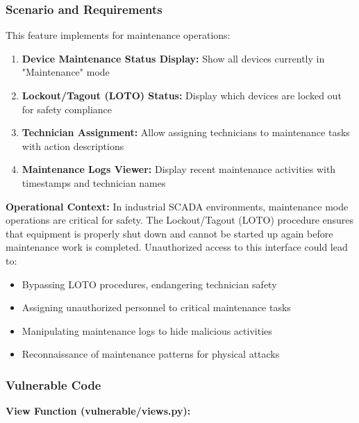 \documentclass[12pt,a4paper]{article}
\begin{document}
\subsubsection{Scenario and Requirements}

This feature implements for maintenance operations:

\begin{enumerate}[leftmargin=*]
    \item \textbf{Device Maintenance Status Display:} Show all devices currently in "Maintenance" mode
    \item \textbf{Lockout/Tagout (LOTO) Status:} Display which devices are locked out for safety compliance
    \item \textbf{Technician Assignment:} Allow assigning technicians to maintenance tasks with action descriptions
    \item \textbf{Maintenance Logs Viewer:} Display recent maintenance activities with timestamps and technician names
\end{enumerate}

\textbf{Operational Context:}
In industrial SCADA environments, maintenance mode operations are critical for safety. The Lockout/Tagout (LOTO) procedure ensures that equipment is properly shut down and cannot be started up again before maintenance work is completed. Unauthorized access to this interface could lead to:
\begin{itemize}[leftmargin=*]
    \item Bypassing LOTO procedures, endangering technician safety
    \item Assigning unauthorized personnel to critical maintenance tasks
    \item Manipulating maintenance logs to hide malicious activities
    \item Reconnaissance of maintenance patterns for physical attacks
\end{itemize}

\subsubsection{Vulnerable Code}

\textbf{View Function (vulnerable/views.py):}
\end{document}
